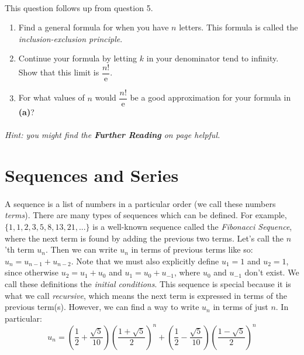 \documentclass[12pt, a4paper, titlepage, twoside]{article}
\newcommand*{\e}{\textrm{e}}
\begin{document}
	\paragraph{}
	 This question follows up from question 5.
	
	\begin{enumerate}[label=\textbf{(\alph*)}]
		\item Find a general formula for when you have $n$ letters. This formula is called the \textit{inclusion-exclusion principle}.
		\item Continue your formula by letting $k$ in your denominator tend to infinity. Show that this limit is $\dfrac{n!}{\e}$.
		\item For what values of $n$ would $\dfrac{n!}{\e}$ be a good approximation for your formula in \textbf{(a)}?
	\end{enumerate}
	
	\paragraph{}
	\textit{Hint: you might find the \textbf{Further Reading} on page \pageref*{fr:ex-pseries} helpful.}
	
	\newpage	
	
	
	
\section{Sequences and Series}

	\paragraph{}
	A sequence is a list of numbers in a particular order (we call these numbers \textit{terms}).
	There are many types of sequences which can be defined. For example, $\{1,1,2,3,5,8,13,21,...\}$ is a well-known sequence
	called the \textit{Fibonacci Sequence}, where the next term is found by adding the previous two terms. Let's call the $n$'th term 
	$u_n$. Then we can write $u_n$ in terms of previous terms like so: $u_n = u_{n-1} + u_{n-2}$. Note that we must also explicitly 
	define $u_1 = 1$ and $u_2 = 1$, since otherwise $u_2 = u_1 + u_0$ and $u_1 = u_0 + u_{-1}$, where $u_0$ and $u_{-1}$ 
	don't exist. We call these definitions the \textit{initial conditions}. This sequence is special because it is what we call \textit{recursive},
	which means the next term is expressed in terms of the previous term(s). However, we can find a way to write $u_n$ in terms of
	just $n$. In particular: $$u_n = \left(\dfrac{1}{2} + \dfrac{\sqrt{5}}{10}\right)\left(\dfrac{1+\sqrt{5}}{2}\right)^n
	+ \left(\dfrac{1}{2} - \dfrac{\sqrt{5}}{10}\right)\left(\dfrac{1-\sqrt{5}}{2}\right)^n$$
	
\end{document}
